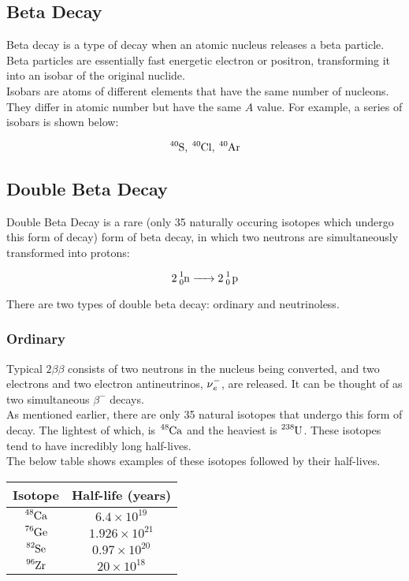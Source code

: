 \documentclass{article}
\begin{document}
\begin{multicols*}{2}
    \subsection{Beta Decay}
    Beta decay is a type of decay when an atomic nucleus releases a beta
    particle. Beta particles are essentially fast energetic electron or
    positron, transforming it into an isobar of the original nuclide.\\

    Isobars are atoms of different elements that have the same number of
    nucleons. They differ in atomic number but have the same $A$ value.
    For example, a series of isobars is shown below:

    \[
      \ce{^{40}S}\text{, }\ce{^{40}Cl}\text{, }\ce{^{40}Ar}
    \]

    \subsection{Double Beta Decay}
    Double Beta Decay is a rare (only 35 naturally occuring isotopes which
    undergo this form of decay) form of beta decay, in which two neutrons
    are simultaneously transformed into protons:

    \[
      \ce{2 ^{1}_{0}n -> 2 ^{1}_{0} p}
    \]

    There are two types of double beta decay: ordinary and neutrinoless.

    \subsubsection{Ordinary}
    Typical $2\beta\beta$ consists of two neutrons in the nucleus being converted,
    and two electrons and two electron antineutrinos, $\ce{\nu^{-}_{e}}$,
    are released. It can be thought of as two simultaneous $\beta^{-}$ decays.\\

    As mentioned earlier, there are only 35 natural isotopes that undergo
    this form of decay. The lightest of which, is $\ce{^{48}Ca}$ and the heaviest
    is $\ce{^{238}U}$. These isotopes tend to have incredibly long half-lives.\\

    The below table shows examples of these isotopes followed by their half-lives.\\
    
    \begin{tabular}{|c|c|}
      \hline
      \textbf{Isotope} & \textbf{Half-life (years)} \\
      \hline
      $\ce{^{48}Ca}$ & $6.4 \times 10^{19}$ \\
      $\ce{^{76}Ge}$ & $1.926 \times 10^{21}$ \\
      $\ce{^{82}Se}$ & $0.97 \times 10^{20}$ \\
      $\ce{^{96}Zr}$ & $20 \times 10^{18}$ \\
      \hline
    \end{tabular}


\end{multicols*}
\end{document}
